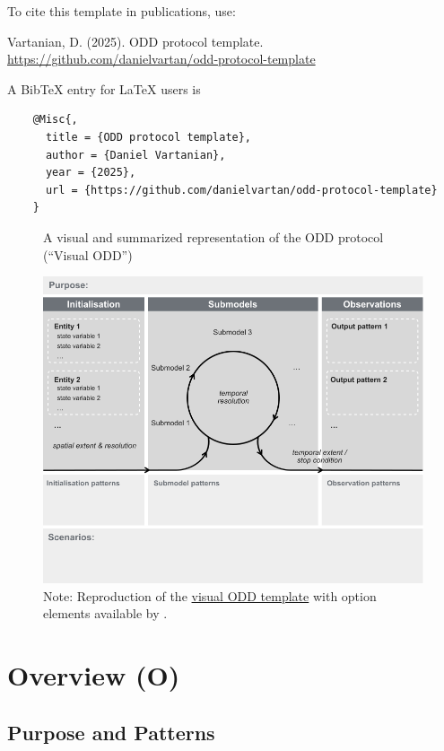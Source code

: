 \begin{citationbox}
  \raggedright
  To cite this template in publications, use:

  \tinyskip

  Vartanian, D. (2025). ODD protocol template. \url{https://github.com/danielvartan/odd-protocol-template}

  \tinyskip

  A BibTeX entry for LaTeX users is

  \begin{verbatim}
    @Misc{,
      title = {ODD protocol template},
      author = {Daniel Vartanian},
      year = {2025},
      url = {https://github.com/danielvartan/odd-protocol-template}
    }
  \end{verbatim}
  \vspace{-1\baselineskip}
\end{citationbox}

\begin{landscape}
  \begin{figure}
    \caption{
      A visual and summarized representation of the ODD protocol (“Visual ODD”)
    }
    \centering
    \includegraphics[width=0.7\linewidth]{images/szangolies-2024-template-optional.png}
    \caption*{
      Note: Reproduction of the \href{https://github.com/visual-ODD/Templates}{visual ODD template} with option elements available by \textcite{szangolies2024}.
    }
    \label{fig:visualodd}
  \end{figure}
\end{landscape}


\section{Overview (O)}

\subsection{Purpose and Patterns}

